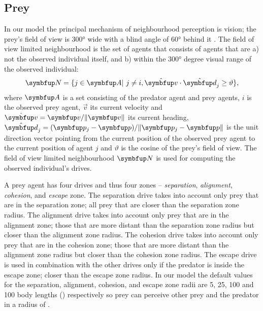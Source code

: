 \subsection{Prey}

In our model the principal mechanism of neighbourhood perception is vision; the prey's field of view is \ang{300} wide with a blind angle of \ang{60} behind it \cite{fernandezjuricic2004visual,reuter2005selforganization}. The field of view limited neighbourhood is the set of agents that consists of agents that are a) not the observed individual itself, and b) within the \ang{300} degree visual range of the observed individual:
%
\begin{equation}
\set{N} = \{j \in \set{A}|\ j \neq i, \uvec{v}\cdot\uvec{d}_j \geq \vartheta\},
\label{eq:neighbourhood}
\end{equation}
%
where $\set{A}$ is a set consisting of the predator agent and prey agents, $i$ is the observed prey agent, $\vec{v}$ its current velocity and $\uvec{v}=\vec{v}/\|\vec{v}\|$ its current heading, $\uvec{d}_j=(\vec{p}_j-\vec{p})/\|\vec{p}_j-\vec{p}\|$ is the unit direction vector pointing from the current position of the observed prey agent to the current position of agent $j$ and $\vartheta$ is the cosine of the prey's field of view. The field of view limited neighbourhood $\set{N}$ is used for computing the observed individual's drives.

A prey agent has four drives and thus four zones -- \emph{separation}, \emph{alignment}, \emph{cohesion}, and \emph{escape} zone. The separation drive takes into account only prey that are in the separation zone; \ie all prey that are closer than the separation zone radius. The alignment drive takes into account only prey that are in the alignment zone; \ie those that are more distant than the separation zone radius but closer than the alignment zone radius. The cohesion drive takes into account only prey that are in the cohesion zone; \ie those that are more distant than the alignment zone radius but closer than the cohesion zone radius. The escape drive is used in combination with the other drives only if the predator is inside the escape zone; \ie closer than the escape zone radius. In our model the default values for the separation, alignment, cohesion, and escape zone radii are 5, 25, 100 and 100 body lengths (\si{\bodylength}) respectively so prey can perceive other prey and the predator in a radius of .

